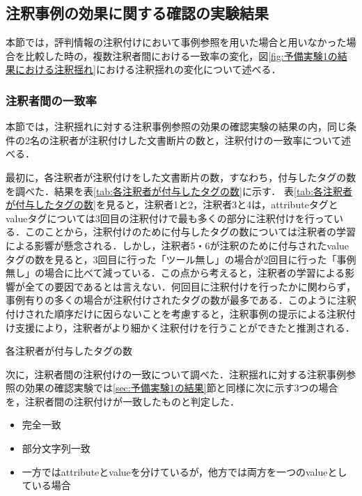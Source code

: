 \documentclass[japanese]{jnlp_1.4}
\begin{document}
\subsection{注釈事例の効果に関する確認の実験結果}
\label{sec:注釈事例の効果に関する確認実験の結果}

本節では，評判情報の注釈付けにおいて事例参照を用いた場合と用いなかった場合を比較した時の，複数注釈者間における一致率の変化，図\ref{fig:予備実験1の結果における注釈揺れ}における注釈揺れの変化について述べる．


\subsubsection{注釈者間の一致率}
\label{sec:注釈者間の一致率}

本節では，注釈揺れに対する注釈事例参照の効果の確認実験の結果の内，同じ条件の2名の注釈者が注釈付けした文書断片の数と，注釈付けの一致率について述べる．

最初に，各注釈者が注釈付けをした文書断片の数，すなわち，付与したタグの数を調べた．結果を表\ref{tab:各注釈者が付与したタグの数}に示す．
表\ref{tab:各注釈者が付与したタグの数}を見ると，注釈者1と2，注釈者3と4は，attributeタグとvalueタグについては3回目の注釈付けで最も多くの部分に注釈付けを行っている．このことから，注釈付けのために付与したタグの数については注釈者の学習による影響が懸念される．しかし，注釈者5・6が注釈のために付与されたvalueタグの数を見ると，3回目に行った「ツール無し」の場合が2回目に行った「事例無し」の場合に比べて減っている．この点から考えると，注釈者の学習による影響が全ての要因であるとは言えない．何回目に注釈付けを行ったかに関わらず，事例有りの多くの場合が注釈付けされたタグの数が最多である．このように注釈付けされた順序だけに因らないことを考慮すると，注釈事例の提示による注釈付け支援により，注釈者がより細かく注釈付けを行うことができたと推測される．

\begin{table}[b]
\vspace{-1\baselineskip}
\caption{各注釈者が付与したタグの数}
\label{tab:各注釈者が付与したタグの数}

\end{table}


次に，注釈者間の注釈付けの一致について調べた．注釈揺れに対する注釈事例参照の効果の確認実験では\ref{sec:予備実験1の結果}節と同様に次に示す3つの場合を，注釈者間の注釈付けが一致したものと判定した．

\begin{itemize}
\item
完全一致
\item
部分文字列一致
\item
一方ではattributeとvalueを分けているが，他方では両方を一つのvalueとしている場合
\end{itemize}
\end{document}
